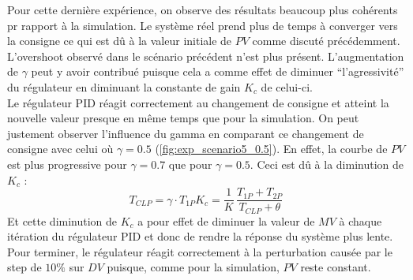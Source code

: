 Pour cette dernière expérience, on observe des résultats beaucoup plus cohérents pr rapport à la simulation. Le système réel prend plus de temps à converger
vers la consigne ce qui est dû à la valeur initiale de $PV$ comme discuté précédemment. L'overshoot observé dans le scénario précédent n'est plus présent.
L'augmentation de $\gamma$ peut y avoir contribué puisque cela a comme effet de diminuer ``l'agressivité'' du régulateur en diminuant la constante de gain $K_c$ de celui-ci.
\\Le régulateur PID réagit correctement au changement de consigne et atteint la nouvelle valeur presque en même temps que pour la simulation. 
On peut justement observer l'influence du gamma en comparant ce changement de consigne avec celui où $\gamma = 0.5$ (\ref{fig:exp_scenario5_0.5}). En effet,
la courbe de $PV$ est plus progressive pour $\gamma = 0.7$ que pour $\gamma = 0.5$. Ceci est dû à la diminution de $K_c$ : 
\begin{equation}
	T_{CLP} = \gamma\cdot T_{1P}
	K_c = \frac{1}{K}\,\frac{T_{1P}+T_{2P}}{T_{CLP}+\theta}
\end{equation}
Et cette diminution de $K_c$ a pour effet de diminuer la valeur de $MV$ à chaque itération du régulateur PID et donc de rendre la réponse du système plus lente.
Pour terminer, le régulateur réagit correctement à la perturbation causée par le step de $10\%$ sur $DV$ puisque, comme pour la simulation, $PV$ reste constant.
